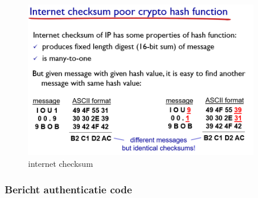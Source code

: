 \begin{figure}[h]
    \centering
    \includegraphics[width=4in]{./img/imghfdst8/hfdst8puntje9.png}
    \caption{internet checksum  }      
    \label{fig:internet checksum }
\end{figure}

\clearpage

\subsubsection{Bericht authenticatie code}

